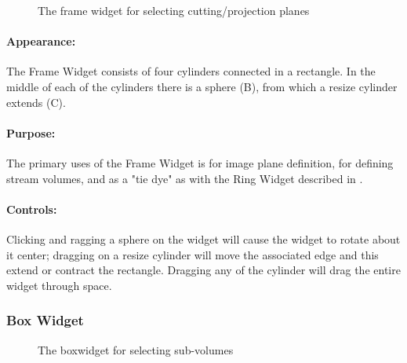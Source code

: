 \begin{figure}[htb]
  \begin{makeimage}
  \end{makeimage}
  \framewidget
  \caption{\label{fig:framewidget} The frame widget for selecting
    cutting/projection planes}
\end{figure}


\paragraph{Appearance: } The Frame Widget consists of four cylinders
connected in a rectangle.  In the middle of each of the cylinders there is
a sphere (B), from which a resize cylinder extends (C).

\paragraph{Purpose:} The primary uses of the Frame Widget is for image
plane definition, for defining stream volumes, and as a "tie dye" as with
the Ring Widget described in .

\paragraph{Controls: } Clicking and ragging a sphere on the widget will
cause the widget to rotate about it center; dragging on a resize cylinder
will move the associated edge and this extend or contract the rectangle.
Dragging any of the cylinder will drag the entire widget through space.


\subsubsection{Box Widget}
\label{sec:view-boxwidget} 

\begin{figure}[htb]
  \begin{makeimage}
  \end{makeimage}
  \boxwidget
  \caption{\label{fig:boxwidget} The boxwidget for selecting sub-volumes}
\end{figure}

